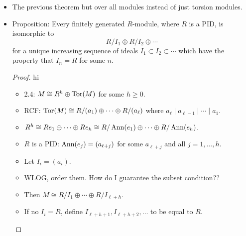 \documentclass[../notes.tex]{subfiles}
\begin{document}
\begin{itemize}
\begin{proof}[Proof of theorem]
\begin{equation*}
            a_r = \prod_{i=1}^\ell p_i^{m_{i,r}}
        \end{equation*}
        for all $r=1,\dots,s_i$. It follows by the construction that $a_{r+1}\mid a_r$ ($r=1,\dots,s_i-1$). Additionally, we have by the \hyperref[trm:7.17]{Chinese Remainder Theorem} that for each $r=1,\dots,s_i$,
        \begin{equation*}
            R/(a_r) \cong \prod_{i=1}^\ell R/(p_i^{m_{i,r}}) = \bigoplus_{i=1}^\ell R/(p_i^{m_{i,r}})
        \end{equation*}
        WLOG, let $s_\ell\geq s_i$ ($i=1,\dots,\ell$). Therefore, putting everything together, we have that
        \begin{align*}
            M &\cong M_{(p_1)}\oplus\cdots\oplus M_{(p_\ell)}\\
            &\cong \left( \bigoplus_{j=1}^{s_1}R/(p_1^{m_{1,j}}) \right)\oplus\cdots\oplus\left( \bigoplus_{j=1}^{s_\ell}R/(p_\ell^{m_{\ell,j}}) \right)\\
            &\cong \left( \bigoplus_{i=1}^\ell R/(p_i^{m_i,1}) \right)\oplus\cdots\oplus\left( \bigoplus_{i=1}^\ell R/(p_i^{m_i,s_\ell}) \right)\\
            &\cong R/(a_1)\oplus\cdots\oplus R/(a_{s_\ell})
        \end{align*}
        as desired.
    \end{proof}
    \item The previous theorem but over all modules instead of just torsion modules.
    \item Proposition: Every finitely generated $R$-module, where $R$ is a PID, is isomorphic to
    \begin{equation*}
        R/I_1\oplus R/I_2\oplus\cdots
    \end{equation*}
    for a unique increasing sequence of ideals $I_1\subset I_2\subset\cdots$ which have the property that $I_n=R$ for some $n$.
    \begin{proof}
        {\color{white}hi}
        \begin{itemize}
            \item 2.4: $M\cong R^h\oplus\operatorname{Tor}(M)$ for some $h\geq 0$.
            \item RCF: $\operatorname{Tor}(M)\cong R/(a_1)\oplus\cdots\oplus R/(a_\ell)$ where $a_\ell\mid a_{\ell-1}\mid\cdots\mid a_1$.
            \item $R^h\cong Re_1\oplus\cdots\oplus Re_h\cong R/\operatorname{Ann}(e_1)\oplus\cdots\oplus R/\operatorname{Ann}(e_h)$.
            \item $R$ is a PID: $\operatorname{Ann}(e_j)=(a_{\ell+j})$ for some $a_{\ell+j}$ and all $j=1,\dots,h$.
            \item Let $I_i=(a_i)$.
            \item WLOG, order them. How do I guarantee the subset condition??
            \item Then $M\cong R/I_1\oplus\cdots\oplus R/I_{\ell+h}$.
            \item If no $I_i=R$, define $I_{\ell+h+1},I_{\ell+h+2},\dots$ to be equal to $R$.
        \end{itemize}


\end{proof}
\end{itemize}
\end{document}
